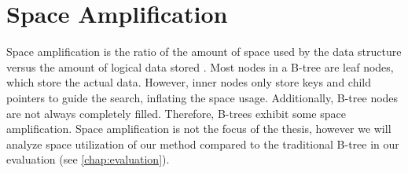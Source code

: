 \section{Space Amplification}
Space amplification is the ratio of the amount of space used by the data structure versus the amount of logical data stored \cite{kuszmaul2014fractal}.
Most nodes in a B-tree are leaf nodes, which store the actual data.
However, inner nodes only store keys and child pointers to guide the search, inflating the space usage.
Additionally, B-tree nodes are not always completely filled.
Therefore, B-trees exhibit some space amplification.
Space amplification is not the focus of the thesis, however we will analyze space utilization of our method compared to the traditional B-tree in our evaluation (see \autoref{chap:evaluation}).